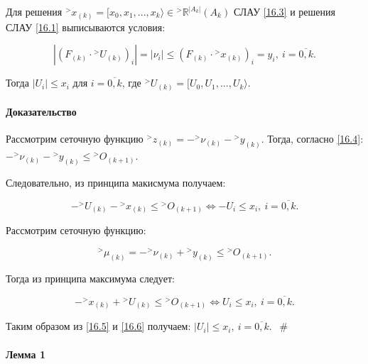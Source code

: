 \documentclass[__main__.tex]{subfiles}
\begin{document}
Для решения ${}^> x_{\left(k\right)} = [x_0, x_1, ..., x_k\rangle \in {}^> \mathbb{R}^{\left|A_k\right|} \left(A_k\right)$ СЛАУ \ref{16.3} и решения СЛАУ \ref{16.1} выписываются условия:

\begin{equation}\label{16.4}
\left| \left(F_{\left(k\right)} \cdot {}^> U_{\left(k\right)}\right)_i \right| = \left|\nu_i\right| \leq \left(F_{\left(k\right)} \cdot {}^> x_{\left(k\right)}\right)_i = y_i, \ i = \overline{0,k}.
\end{equation}

Тогда $\left|U_i\right| \leq x_i$ для $i = \overline{0,k}$, где ${}^> U_{\left(k\right)} = [ U_0, U_1, ..., U_k \rangle$.

\paragraph{Доказательство}

Рассмотрим сеточную функцию ${}^> z_{\left(k\right)} = - {}^> \nu_{\left(k\right)} - {}^> y_{\left(k\right)}$. Тогда, согласно \ref{16.4}: $- {}^>\nu_{\left(k\right)} - {}^> y_{\left(k\right)}\leq {}^> O_{\left(k+1\right)}$. 

Следовательно, из принципа макисмума получаем:

\begin{equation} \label{16.5}
- {}^> U_{\left(k\right)} - {}^> x_{\left(k\right)} \leq {}^> O_{\left(k+1\right)} \Leftrightarrow - U_i \leq x_i, \ i = \overline{0,k}.
\end{equation}

Рассмотрим сеточную функцию:

$$
{}^> \mu_{\left(k\right)} = - {}^> \nu_{\left(k\right)} + {}^> y_{\left(k\right)} \leq {}^> O_{\left(k+1\right)}.
$$

Тогда из принципа максимума следует:

\begin{equation}\label{16.6}
- {}^> x_{\left(k\right)} + {}^> U_{\left(k\right)} \leq {}^> O_{\left(k+1\right)} \Leftrightarrow U_i \leq x_i, \ i= \overline{0,k}.
\end{equation}

Таким образом из \ref{16.5} и \ref{16.6} получаем: $\left|U_i\right| \leq x_i, \ i = \overline{0,k}$. $\ \ \#$

\paragraph{Лемма 1}
\end{document}
